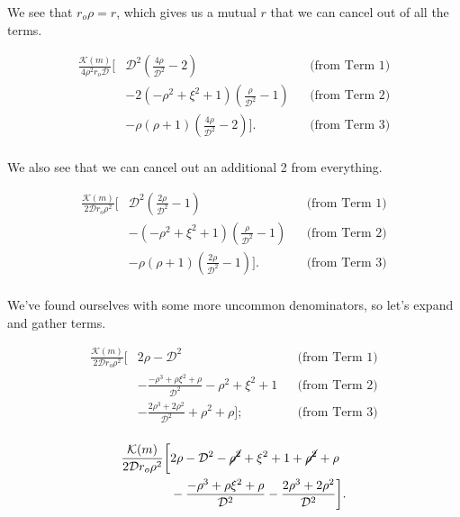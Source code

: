 \noindent We see that \(r_o\rho=r\), which gives us a mutual \(r\) that we can cancel out of all the terms.

\begin{equation}
    \begin{aligned}
        \frac{\mathcal{K}(m)}{4\rho^2 r_o\mathcal{D} } \bigg[&  \mathcal{D}^2 \left(\frac{4\rho}{\mathcal{D}^2}-2\right)  && \text{(from Term 1)} \\
      &- 2(-\rho^2+\xi^2+1)\left(\frac{\rho}{\mathcal{D}^2}-1\right) && \text{(from Term 2)} \\
      &- \rho (\rho+1)\left(\frac{4\rho}{\mathcal{D}^2}-2\right) \bigg]. && \text{(from Term 3)} \\
    \end{aligned}
\end{equation}

\noindent We also see that we can cancel out an additional 2 from everything.

\begin{equation}
    \begin{aligned}
        \frac{\mathcal{K}(m)}{2\mathcal{D}r_o \rho^2} \bigg[&  \mathcal{D}^2 \left(\frac{2\rho}{\mathcal{D}^2}-1\right)  && \text{(from Term 1)} \\
      &- (-\rho^2+\xi^2+1)\left(\frac{\rho}{\mathcal{D}^2}-1\right) && \text{(from Term 2)} \\
      &- \rho (\rho+1)\left(\frac{2\rho}{\mathcal{D}^2}-1\right) \bigg]. && \text{(from Term 3)} \\
    \end{aligned}
\end{equation}

We've found ourselves with some more uncommon denominators, so let's expand and gather terms.

\begin{equation}
    \begin{aligned}
        \frac{\mathcal{K}(m)}{2\mathcal{D}r_o \rho^2 } \bigg[&   2\rho-\mathcal{D}^2  && \text{(from Term 1)} \\
        &- \frac{-\rho^3+\rho\xi^2+\rho}{\mathcal{D}^2}-\rho^2+\xi^2+1 && \text{(from Term 2)} \\
      &- \frac{2\rho^3 +2\rho^2}{\mathcal{D}^2}+\rho^2 + \rho \bigg]; && \text{(from Term 3)} \\
    \end{aligned}
\end{equation}

\begin{equation}
    \begin{aligned}
        \frac{\mathcal{K}(m)}{2\mathcal{D}r_o \rho^2 } \bigg[&   2\rho-\mathcal{D}^2 -\cancel{\rho^2} +\xi^2 +1 +\cancel{\rho^2} + \rho \\
        &- \frac{-\rho^3+\rho\xi^2+\rho}{\mathcal{D}^2} - \frac{2\rho^3 +2\rho^2}{\mathcal{D}^2} \bigg].
    \end{aligned}
\end{equation}

